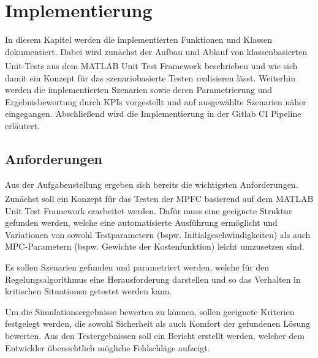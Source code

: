 \chapter{Implementierung} \label{chap:Implementierung}
\thispagestyle{empty}
In diesem Kapitel werden die implementierten Funktionen und Klassen dokumentiert. Dabei wird zunächst der Aufbau und Ablauf von klassenbasierten Unit-Tests aus dem MATLAB\textsuperscript{\textregistered} Unit Test Framework beschrieben und wie sich damit ein Konzept für das szenariobasierte Testen realisieren lässt. Weiterhin werden die implementierten Szenarien sowie deren Parametrierung und Ergebnisbewertung durch KPIs vorgestellt und auf ausgewählte Szenarien näher eingegangen. Abschließend wird die Implementierung in der Gitlab CI Pipeline erläutert.

\section{Anforderungen} \label{sec:Anforderungen}
Aus der Aufgabenstellung ergeben sich bereits die wichtigsten Anforderungen. Zunächst soll ein Konzept für das Testen der MPFC basierend auf dem MATLAB\textsuperscript{\textregistered} Unit Test Framework erarbeitet werden. Dafür muss eine geeignete Struktur gefunden werden, welche eine automatisierte Ausführung ermöglicht und Variationen von sowohl Testparametern (bspw. Initialgeschwindigkeiten) als auch MPC-Parametern (bspw. Gewichte der Kostenfunktion) leicht umzusetzen sind. 

Es sollen Szenarien gefunden und parametriert werden, welche für den Regelungsalgorithmus eine Herausforderung darstellen und so das Verhalten in kritischen Situationen getestet werden kann.

Um die Simulationsergebnisse bewerten zu können, sollen geeignete Kriterien festgelegt werden, die sowohl Sicherheit als auch Komfort der gefundenen Lösung bewerten. Aus den Testergebnissen soll ein Bericht erstellt werden, welcher dem Entwickler übersichtlich mögliche Fehlschläge aufzeigt.

